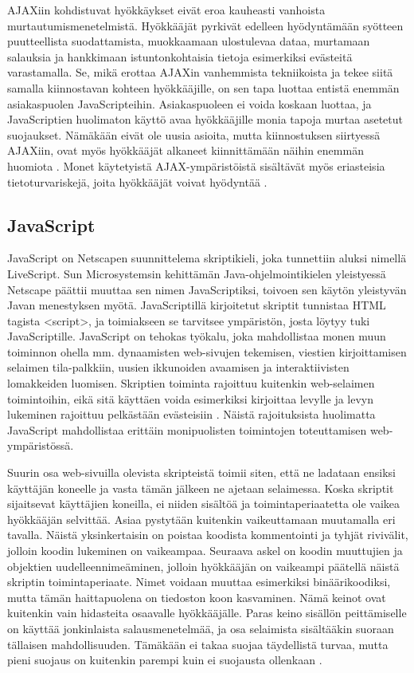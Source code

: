 AJAXiin kohdistuvat hyökkäykset eivät eroa kauheasti vanhoista murtautumismenetelmistä. Hyökkääjät pyrkivät edelleen hyödyntämään syötteen puutteellista suodattamista, muokkaamaan ulostulevaa
dataa, murtamaan salauksia ja hankkimaan istuntonkohtaisia tietoja esimerkiksi evästeitä varastamalla. Se, mikä erottaa AJAXin vanhemmista tekniikoista ja tekee siitä samalla kiinnostavan
kohteen hyökkääjille, on sen tapa luottaa entistä enemmän asiakaspuolen JavaScripteihin. Asiakaspuoleen ei voida koskaan luottaa, ja JavaScriptien huolimaton käyttö avaa hyökkääjille monia
tapoja murtaa asetetut suojaukset. Nämäkään eivät ole uusia asioita, mutta kiinnostuksen siirtyessä AJAXiin, ovat myös hyökkääjät alkaneet kiinnittämään näihin enemmän huomiota \cite{AJAX}.
Monet käytetyistä AJAX-ympäristöistä sisältävät myös eriasteisia tietoturvariskejä, joita hyökkääjät voivat hyödyntää \cite{JSH}.

\subsection{JavaScript}

JavaScript on Netscapen suunnittelema skriptikieli, joka tunnettiin aluksi nimellä LiveScript. Sun Microsystemsin kehittämän Java-ohjelmointikielen yleistyessä Netscape päättii muuttaa 
sen nimen JavaScriptiksi, toivoen sen käytön yleistyvän Javan menestyksen myötä. JavaScriptillä kirjoitetut skriptit tunnistaa HTML tagista <script>, ja toimiakseen se tarvitsee ympäristön,
josta löytyy tuki JavaScriptille. JavaScript on tehokas työkalu, joka  mahdollistaa monen muun toiminnon ohella mm. dynaamisten web-sivujen tekemisen, viestien kirjoittamisen selaimen 
tila-palkkiin, uusien ikkunoiden avaamisen ja interaktiivisten lomakkeiden luomisen. Skriptien toiminta rajoittuu kuitenkin web-selaimen toimintoihin, eikä sitä käyttäen voida esimerkiksi 
kirjoittaa levylle ja levyn lukeminen rajoittuu pelkästään evästeisiin \cite{JavaScript}. Näistä rajoituksista huolimatta JavaScript mahdollistaa erittäin monipuolisten toimintojen 
toteuttamisen web-ympäristössä.

Suurin osa web-sivuilla olevista skripteistä toimii siten, että ne ladataan ensiksi käyttäjän koneelle ja vasta tämän jälkeen ne ajetaan selaimessa. Koska skriptit sijaitsevat käyttäjien 
koneilla, ei niiden sisältöä ja toimintaperiaatetta ole vaikea hyökkääjän selvittää. Asiaa pystytään kuitenkin vaikeuttamaan muutamalla eri tavalla. Näistä yksinkertaisin on poistaa koodista
kommentointi ja tyhjät rivivälit, jolloin koodin lukeminen on vaikeampaa. Seuraava askel on koodin muuttujien ja objektien uudelleennimeäminen, jolloin hyökkääjän on vaikeampi päätellä näistä
skriptin toimintaperiaate. Nimet voidaan muuttaa esimerkiksi binäärikoodiksi, mutta tämän haittapuolena on tiedoston koon kasvaminen. Nämä keinot ovat kuitenkin vain hidasteita osaavalle 
hyökkääjälle. Paras keino sisällön peittämiselle on käyttää jonkinlaista salausmenetelmää, ja osa selaimista sisältääkin suoraan tällaisen mahdollisuuden. Tämäkään ei takaa suojaa täydellistä
turvaa, mutta pieni suojaus on kuitenkin parempi kuin ei suojausta ollenkaan \cite{AJAX}.

